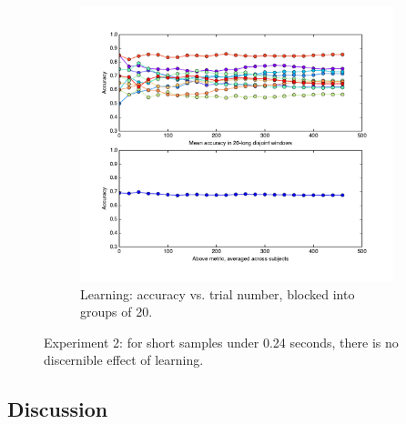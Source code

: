 \begin{figure}[htb]
\centering
\begin{subfigure}[b]{\textwidth}
\centering
                \includegraphics[width=12cm]{img/fig_fire4accuracyWalkingWindow.pdf}
                \caption{Learning: accuracy vs. trial number, blocked into groups of 20.}
      		\label{f:e2:learn}
        \end{subfigure}
\caption{Experiment 2: for short samples under 0.24 seconds, there is no discernible effect of learning.}
\end{figure}

\subsection{Discussion}